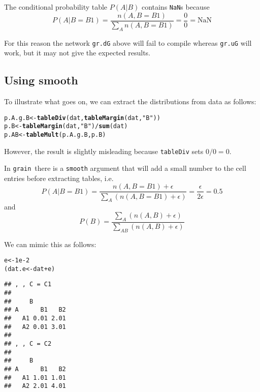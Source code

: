 \documentclass[10pt]{article}\usepackage[]{graphicx}\usepackage[]{color}
\makeatletter
\newcommand{\hlnum}[1]{\textcolor[rgb]{0.686,0.059,0.569}{#1}}%
\newcommand{\hlstr}[1]{\textcolor[rgb]{0.192,0.494,0.8}{#1}}%
\newcommand{\hlopt}[1]{\textcolor[rgb]{0,0,0}{#1}}%
\newcommand{\hlstd}[1]{\textcolor[rgb]{0.345,0.345,0.345}{#1}}%
\newcommand{\hlkwb}[1]{\textcolor[rgb]{0.69,0.353,0.396}{#1}}%
\newcommand{\hlkwd}[1]{\textcolor[rgb]{0.737,0.353,0.396}{\textbf{#1}}}%
\newenvironment{kframe}{%
 \def\at@end@of@kframe{}%
 \ifinner\ifhmode%
  \def\at@end@of@kframe{\end{minipage}}%
  \begin{minipage}{\columnwidth}%
 \fi\fi%
 \def\FrameCommand##1{\hskip\@totalleftmargin \hskip-\fboxsep
 \colorbox{shadecolor}{##1}\hskip-\fboxsep
     \hskip-\linewidth \hskip-\@totalleftmargin \hskip\columnwidth}%
 \MakeFramed {\advance\hsize-\width
   \@totalleftmargin\z@ \linewidth\hsize
   \@setminipage}}%
 {\par\unskip\endMakeFramed%
 \at@end@of@kframe}
\newenvironment{knitrout}{}{} %
\def\grain{\texttt{grain}}
\def\code#1{{\texttt{#1}}}
\makeatother
\begin{document}
The conditional probability table $P(A|B)$ contains \code{NaN}s
because
\begin{displaymath}
  P(A|B=B1)=\frac{n(A,B=B1)}{\sum_A n(A,B=B1)} = \frac{0}{0} = \mbox{NaN}
\end{displaymath}

For this reason the network \code{gr.dG} above will fail to compile
whereas \code{gr.uG} will work, but it may not give the expected results.

\subsection{Using smooth}
\label{sec:using-smooth}

To illustrate what goes on, we can extract the distributions from data
as follows:

\begin{knitrout}
\color{fgcolor}\begin{kframe}
\begin{alltt}
\hlstd{p.A.g.B} \hlkwb{<-} \hlkwd{tableDiv}\hlstd{(dat,} \hlkwd{tableMargin}\hlstd{(dat,} \hlstr{"B"}\hlstd{))}
\hlstd{p.B}     \hlkwb{<-} \hlkwd{tableMargin}\hlstd{(dat,} \hlstr{"B"}\hlstd{)} \hlopt{/} \hlkwd{sum}\hlstd{(dat)}
\hlstd{p.AB}    \hlkwb{<-} \hlkwd{tableMult}\hlstd{( p.A.g.B, p.B)}
\end{alltt}
\end{kframe}
\end{knitrout}

However, the result is slightly misleading because \code{tableDiv}
sets $0/0=0$.

In \grain\ there is a \code{smooth} argument that will add a small
number to the cell entries before extracting tables, i.e.
\begin{displaymath}
  P(A|B=B1)=\frac{n(A,B=B1)+\epsilon}{\sum_A ( n(A,B=B1) + \epsilon) }
  = \frac{\epsilon}{2\epsilon} = 0.5
\end{displaymath}
and
\begin{displaymath}
  P(B)= \frac{\sum_A (n(A,B)+\epsilon)}{\sum_{AB} (n(A,B)+\epsilon)}
\end{displaymath}

We can mimic this as follows:
\begin{knitrout}
\color{fgcolor}\begin{kframe}
\begin{alltt}
\hlstd{e} \hlkwb{<-} \hlnum{1e-2}
\hlstd{(dat.e} \hlkwb{<-} \hlstd{dat} \hlopt{+} \hlstd{e)}
\end{alltt}
\begin{verbatim}
## , , C = C1
## 
##     B
## A      B1   B2
##   A1 0.01 2.01
##   A2 0.01 3.01
## 
## , , C = C2
## 
##     B
## A      B1   B2
##   A1 1.01 1.01
##   A2 2.01 4.01
\end{verbatim}
\end{kframe}
\end{knitrout}
\end{document}
